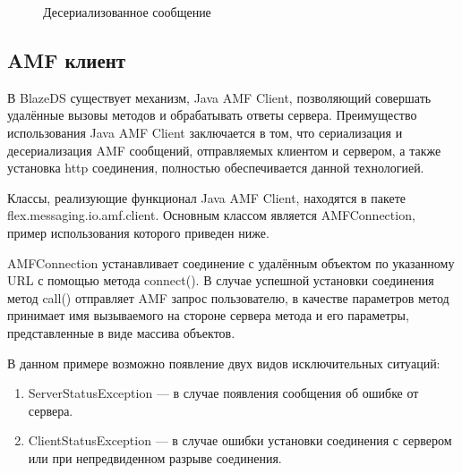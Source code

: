 \begin{figure}[ht]
\caption{Десериализованное сообщение}
\label{ris:deserialisedMessage.png}
\end{figure} 

\subsection{AMF клиент}

В BlazeDS существует механизм, Java AMF Client, позволяющий совершать удалённые вызовы методов и обрабатывать ответы
сервера. Преимущество использования Java AMF Client заключается в том, что сериализация и десериализация AMF сообщений,
отправляемых клиентом и сервером, а также установка http соединения, полностью обеспечивается данной технологией.

Классы, реализующие функционал Java AMF Client, находятся в пакете flex.messaging.io.amf.client. Основным классом
является AMFConnection, пример использования которого приведен ниже.



AMFConnection устанавливает соединение с удалённым объектом по указанному URL с помощью метода connect().
В случае успешной установки соединения метод call() отправляет AMF запрос пользователю, в качестве параметров метод
принимает имя вызываемого на стороне сервера метода и его параметры, представленные в виде массива объектов.

В данном примере возможно появление двух видов исключительных ситуаций:

\begin{enumerate}
\item ServerStatusException --- в случае появления сообщения об ошибке от сервера.
\item ClientStatusException --- в случае ошибки установки соединения с сервером или при непредвиденном разрыве
соединения.
\end{enumerate}

